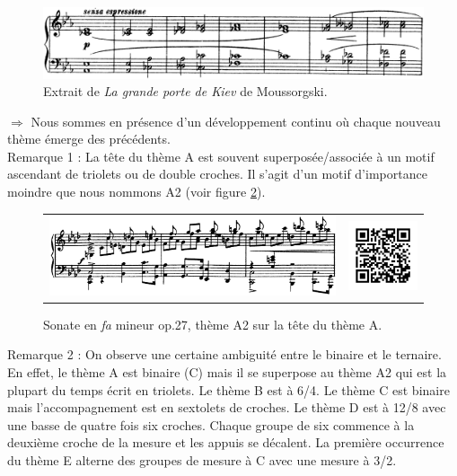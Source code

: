 \begin{figure}[!p]
  \begin{bigcenter}
    \includegraphics[width=15cm, keepaspectratio]{kiev.png}
  \end{bigcenter}
  \caption{\label{grande-porte-de-kiev}Extrait de \emph{La grande porte de Kiev} de Moussorgski.}
\end{figure}

$\Rightarrow$ Nous sommes en présence d'un développement continu où chaque nouveau thème émerge des précédents.\\

Remarque 1 : La tête du thème A est souvent superposée/associée à un motif ascendant de triolets ou de double croches. Il s'agit d'un motif d'importance moindre que nous nommons A2 (voir figure \ref{sonate-theme-12}).\\

\begin{figure}[!ht]
  \begin{bigcenter}
    \begin{tabular}{lr}
      \includegraphics[width=12.5cm, keepaspectratio]{sonate-theme-A2.png}
      &
      \includegraphics[width=3cm, keepaspectratio]{op1-qr.png}
    \end{tabular}
  \end{bigcenter}
  \caption{\label{sonate-theme-12}Sonate en \emph{fa} mineur op.27, thème A2 sur la tête du thème A.}
\end{figure}

Remarque 2 : On observe une certaine ambiguité entre le binaire et le ternaire. En effet, le thème A est binaire (C) mais il se superpose au thème A2 qui est la plupart du temps écrit en triolets. Le thème B est à 6/4. Le thème C est binaire mais l'accompagnement est en sextolets de croches. Le thème D est à 12/8 avec une basse de quatre fois six croches. Chaque groupe de six commence à la deuxième croche de la mesure et les appuis se décalent. La première occurrence du thème E alterne des groupes de mesure à C avec une mesure à 3/2.

